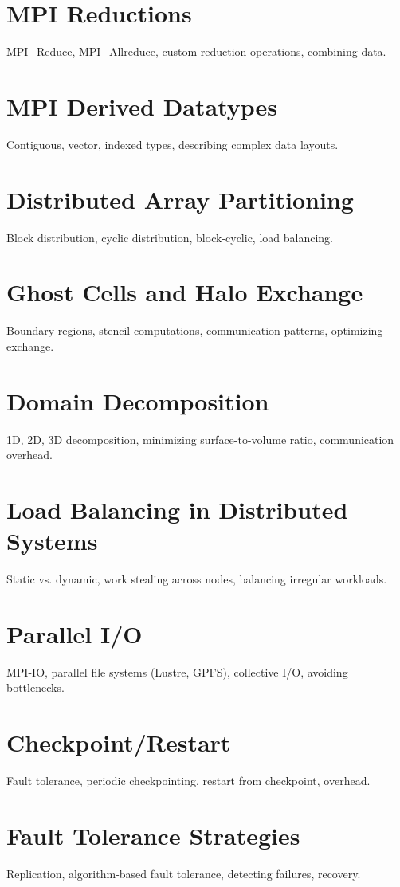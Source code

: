 \chapter{MPI Reductions}
MPI\_Reduce, MPI\_Allreduce, custom reduction operations, combining data.

\chapter{MPI Derived Datatypes}
Contiguous, vector, indexed types, describing complex data layouts.

\chapter{Distributed Array Partitioning}
Block distribution, cyclic distribution, block-cyclic, load balancing.

\chapter{Ghost Cells and Halo Exchange}
Boundary regions, stencil computations, communication patterns, optimizing exchange.

\chapter{Domain Decomposition}
1D, 2D, 3D decomposition, minimizing surface-to-volume ratio, communication overhead.

\chapter{Load Balancing in Distributed Systems}
Static vs. dynamic, work stealing across nodes, balancing irregular workloads.

\chapter{Parallel I/O}
MPI-IO, parallel file systems (Lustre, GPFS), collective I/O, avoiding bottlenecks.

\chapter{Checkpoint/Restart}
Fault tolerance, periodic checkpointing, restart from checkpoint, overhead.

\chapter{Fault Tolerance Strategies}
Replication, algorithm-based fault tolerance, detecting failures, recovery.

